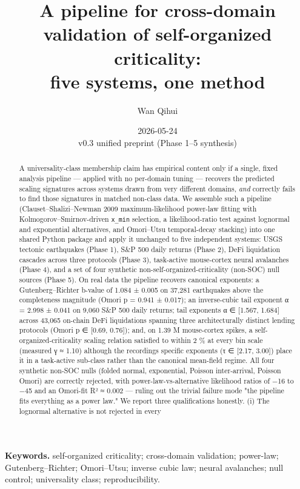 \documentclass[
  11pt]{article}
\title{A pipeline for cross-domain validation of self-organized criticality:\\
five systems, one method}
\author{Wan Qihui}
\affil{Structural Isomorphism Project, Independent Researcher\\
\texttt{https://structural.bytedance.city}}
\date{2026-05-24 \\ \small v0.3 unified preprint (Phase 1--5 synthesis)}
\begin{document}
\maketitle

\noindent\textbf{Keywords.} self-organized criticality; cross-domain validation; power-law;
Gutenberg--Richter; Omori--Utsu; inverse cubic law; neural avalanches;
null control; universality class; reproducibility.

\begin{abstract}

A universality-class membership claim has empirical content only if a
single, fixed analysis pipeline --- applied with no per-domain tuning
--- recovers the predicted scaling signatures across systems drawn from
very different domains, \emph{and} correctly fails to find those
signatures in matched non-class data. We assemble such a pipeline
(Clauset--Shalizi--Newman 2009 maximum-likelihood power-law fitting with
Kolmogorov--Smirnov-driven \texttt{x\_min} selection, a likelihood-ratio
test against lognormal and exponential alternatives, and Omori--Utsu
temporal-decay stacking) into one shared Python package and apply it
unchanged to five independent systems: USGS tectonic earthquakes (Phase
1), S\&P 500 daily returns (Phase 2), DeFi liquidation cascades across
three protocols (Phase 3), task-active mouse-cortex neural avalanches
(Phase 4), and a set of four synthetic non-self-organized-criticality
(non-SOC) null sources (Phase 5). On real data the pipeline recovers
canonical exponents: a Gutenberg--Richter b-value of 1.084 ± 0.005 on
37,281 earthquakes above the completeness magnitude (Omori p = 0.941 ±
0.017); an inverse-cubic tail exponent α = 2.998 ± 0.041 on 9,060 S\&P
500 daily returns; tail exponents α ∈ {[}1.567, 1.684{]} across 43,065
on-chain DeFi liquidations spanning three architecturally distinct
lending protocols (Omori p ∈ {[}0.69, 0.76{]}); and, on 1.39 M
mouse-cortex spikes, a self-organized-criticality scaling relation
satisfied to within 2 \% at every bin scale (measured γ ≈ 1.10) although
the recording\textquotesingle s specific exponents (τ ∈ {[}2.17,
3.00{]}) place it in a task-active sub-class rather than the canonical
mean-field regime. All four synthetic non-SOC nulls (folded normal,
exponential, Poisson inter-arrival, Poisson Omori) are correctly
rejected, with power-law-vs-alternative likelihood ratios of −16 to −45
and an Omori-fit R² ≈ 0.002 --- ruling out the trivial failure mode "the
pipeline fits everything as a power law." We report three qualifications
honestly. (i) The lognormal alternative is not rejected in every

\end{abstract}
\end{document}
